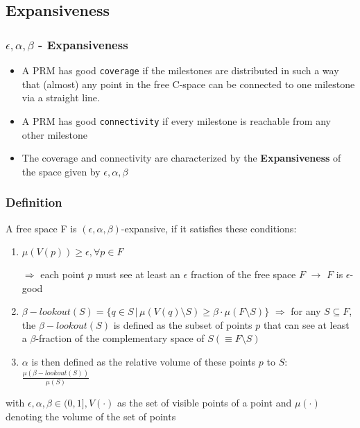 \documentclass{beamer}
\begin{document}
  \subsection{Expansiveness}

  \begin{frame}
    \frametitle{$\epsilon, \alpha, \beta$ - Expansiveness}

    \begin{itemize}
      \item A PRM has good \texttt{coverage} if the milestones are distributed in such a way that (almost) any point in the free C-space can be connected to one milestone via a straight line.
      \item A PRM has good \texttt{connectivity} if every milestone is reachable from any other milestone
      \item The coverage and connectivity are characterized by the \textbf{Expansiveness} of the space given by $\epsilon, \alpha, \beta$
    \end{itemize}
  
  \end{frame}

  \begin{frame}
    \frametitle{Definition}
    A free space F is $(\epsilon, \alpha, \beta)$-expansive, if it satisfies these conditions:

    \begin{enumerate}
      \item $\mu(V(p)) \geq \epsilon, \forall p \in F$

      $\Longrightarrow$ each point $p$ must see at least an $\epsilon$ fraction of the free space $F$ $\rightarrow$ $F$ is $\epsilon$-good
      \item $\beta - lookout(S) = \{q \in S \,|\,  \mu(V(q)\setminus S) \geq \beta \cdot \mu(F\setminus S)\}$ 
      $\Longrightarrow$ for any $S \subseteq F$, the $\beta - lookout(S)$ is defined as the subset of points $p$ that can see at least a $\beta$-fraction of the complementary space of $S (\equiv F \setminus S)$
      \item $\alpha$ is then defined as the relative volume of these points $p$ to $S$: $\frac{\mu(\beta - lookout(S))}{\mu(S)}$
    \end{enumerate}

    with $\epsilon, \alpha, \beta \in (0, 1], V(\cdot)$ as the set of visible points of a point and $\mu(\cdot)$ denoting the volume of the set of points
    
  
  \end{frame}
\end{document}
